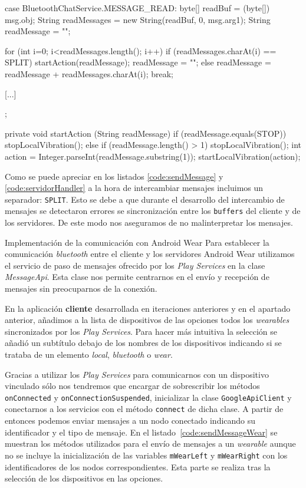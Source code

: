 \begin{definitionlist}
\begin{listing}
{{{      case BluetoothChatService.MESSAGE_READ:
        byte[] readBuf = (byte[]) msg.obj;
        String readMessages = new String(readBuf, 0, msg.arg1);
        String readMessage = "";
                
        for (int i=0; i<readMessages.length(); i++) {
          if (readMessages.charAt(i) == SPLIT) {
            startAction(readMessage);
            readMessage = "";
          } else {
            readMessage = readMessage + readMessages.charAt(i);
          }
        }
        break;

      [...]
    }
  }
};

private void startAction (String readMessage) {
  if (readMessage.equals(STOP)) {
    stopLocalVibration();
  } else if (readMessage.length() > 1) {
    stopLocalVibration();
    int action = Integer.parseInt(readMessage.substring(1));
    startLocalVibration(action);
  }
}
\end{listing}

    Como se puede apreciar en los listados \ref{code:sendMessage} y \ref{code:servidorHandler} a la
    hora de intercambiar mensajes incluimos un separador: \texttt{SPLIT}. Esto se debe a que durante
    el desarrollo del intercambio de mensajes se detectaron errores se sincronización entre los
    \texttt{buffers} del cliente y de los servidores. De este modo nos aseguramos de no
    malinterpretar los mensajes.

  \item[Implementación de la comunicación con Android Wear] Para establecer la comunicación
    \emph{bluetooth} entre el cliente y los servidores Android Wear utilizamos el servicio de paso
    de mensajes ofrecido por los \emph{Play Services} en la clase \emph{MessageApi}. Esta clase nos
    permite centrarnos en el envío y recepción de mensajes sin preocuparnos de la conexión.

    En la aplicación \textbf{cliente} desarrollada en iteraciones anteriores y en el apartado
    anterior, añadimos a la lista de dispositivos de las opciones todos los \emph{wearables}
    sincronizados por los \emph{Play Services}. Para hacer más intuitiva la selección se añadió un
    subtítulo debajo de los nombres de los dispositivos indicando si se trataba de un elemento
    \emph{local}, \emph{bluetooth} o \emph{wear}.

    Gracias a utilizar los \emph{Play Services} para comunicarnos con un dispositivo vinculado sólo
    nos tendremos que encargar de sobrescribir los métodos \texttt{onConnected} y
    \texttt{onConnectionSuspended}, inicializar la clase \texttt{GoogleApiClient} y conectarnos a
    los servicios con el método \texttt{connect} de dicha clase. A partir de entonces podemos enviar
    mensajes a un nodo conectado indicando su identificador y el tipo de mensaje. En el
    listado~\ref{code:sendMessageWear} se muestran los métodos utilizados para el envío de mensajes
    a un \emph{wearable} aunque no se incluye la inicialización de las variables \texttt{mWearLeft}
    y \texttt{mWearRight} con los identificadores de los nodos correspondientes. Esta parte se
    realiza tras la selección de los dispositivos en las opciones.


\end{definitionlist}
